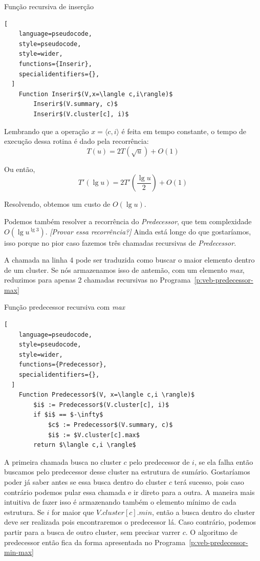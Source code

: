 \begin{programruledcaption}{Função recursiva de inserção \label{p:veb-first-insert}}
  \begin{lstlisting}[
    language=pseudocode,
    style=pseudocode,
    style=wider,
    functions={Inserir},
    specialidentifiers={},
  ]
    Function Inserir$(V,x=\langle c,i\rangle)$
        Inserir$(V.summary, c)$
        Inserir$(V.cluster[c], i)$
  \end{lstlisting}
\end{programruledcaption}

Lembrando que a operação $x=\langle c, i \rangle$ é feita em tempo constante, o
tempo de execução dessa rotina é dado pela recorrência:
\[
T(u) = 2T(\sqrt{u}) + O(1)
\]

Ou então,
\[
T'(\lg u) = 2T'\left (\frac{\lg u}{2}\right ) + O(1)
\]

Resolvendo, obtemos um custo de $O(\lg u)$.

Podemos também resolver a recorrência do \textit{Predecessor}, que tem
complexidade $O(\lg u^{\lg 3})$. \textit{[Provar essa recorrência?]} Ainda está
longe do que gostaríamos, isso porque no pior caso fazemos três chamadas
recursivas de \textit{Predecessor}.

A chamada na linha 4 pode ser traduzida como buscar o maior elemento dentro de
um cluster. Se nós armazenamos isso de antemão, com um elemento \textit{max},
reduzimos para apenas 2 chamadas recursivas no
Programa~\ref{p:veb-predecessor-max}

\begin{programruledcaption}{Função predecessor recursiva com \emph{max} \label{p:veb-predecessor-max}}
  \begin{lstlisting}[
    language=pseudocode,
    style=pseudocode,
    style=wider,
    functions={Predecessor},
    specialidentifiers={},
  ]
    Function Predecessor$(V, x=\langle c,i \rangle)$
        $i$ := Predecessor$(V.cluster[c], i)$
        if $i$ == $-\infty$
            $c$ := Predecessor$(V.summary, c)$
            $i$ := $V.cluster[c].max$
        return $\langle c,i \rangle$
  \end{lstlisting}
\end{programruledcaption}

A primeira chamada busca no cluster $c$ pelo predecessor de $i$, se ela falha
então buscamos pelo predecessor desse cluster na estrutura de sumário.
Gostaríamos poder já saber antes se essa busca dentro do cluster $c$ terá
sucesso, pois caso contrário podemos pular essa chamada e ir direto para a
outra. A maneira mais intuitiva de fazer isso é armazenando também o elemento
mínimo de cada estrutura. Se $i$ for maior que $V.cluster[c].min$, então a busca
dentro do cluster deve ser realizada pois encontraremos o predecessor lá. Caso
contrário, podemos partir para a busca de outro cluster, sem precisar varrer
$c$. O algoritmo de predecessor então fica da forma apresentada no
Programa~\ref{p:veb-predecessor-min-max}


